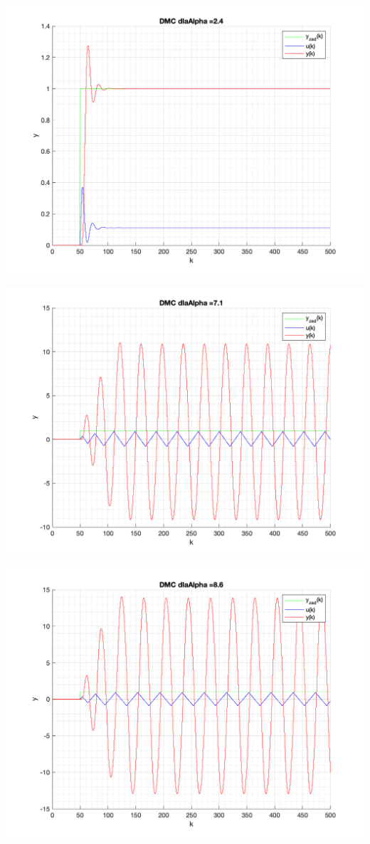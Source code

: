 \documentclass[a4paper, 11pt]{article}
\begin{document}
\begin{enumerate}
 \includegraphics[width=\linewidth]{./ModelsDodatkowe_Alpha/P4_DMC_Alpha_2_4_png.png} 
 
 \includegraphics[width=\linewidth]{./ModelsDodatkowe_Alpha/P4_DMC_Alpha_7_1_png.png} 
 
 \includegraphics[width=\linewidth]{./ModelsDodatkowe_Alpha/P4_DMC_Alpha_8_6_png.png} 
 

\end{enumerate}
\end{document}

